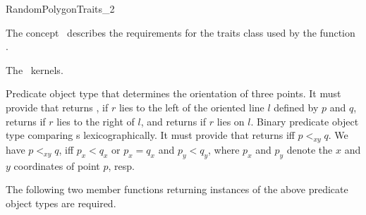 \begin{ccRefConcept}{RandomPolygonTraits_2}

\ccDefinition

The concept \ccRefName\ describes the requirements for the traits
class used by the function .

\ccHasModels

The \cgal\ kernels.

\ccTypes
{}
      {Predicate object type that determines the orientation of three points.
       It must provide  that
       returns , if $r$ lies to the left of the oriented
       line $l$ defined by $p$ and $q$, returns  if $r$
       lies to the right of $l$, and returns  if $r$ lies
       on $l$.}
       {Binary predicate object type comparing s lexicographically.
        It must provide  that 
        returns  iff $p <_{xy} q$.
        We have $p<_{xy}q$, iff $p_x < q_x$ or $p_x = q_x$ and $p_y < q_y$,
        where $p_x$ and $p_y$ denote the $x$ and $y$ coordinates of point $p$,
        resp.
       }
                        

\ccOperations

The following two member functions returning instances of the above predicate
object types are required.



\end{ccRefConcept}
